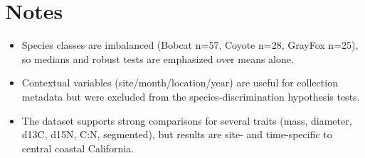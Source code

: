 \documentclass[11pt,a4paper]{article}
\begin{document}
\section*{Notes}
\begin{itemize}
\item Species classes are imbalanced (Bobcat n=57, Coyote n=28, GrayFox n=25), so medians and robust tests are emphasized over means alone.
\item Contextual variables (site/month/location/year) are useful for collection metadata but were excluded from the species-discrimination hypothesis tests.
\item The dataset supports strong comparisons for several traits (mass, diameter, d13C, d15N, C:N, segmented), but results are site- and time-specific to central coastal California.
\end{itemize}
\end{document}
